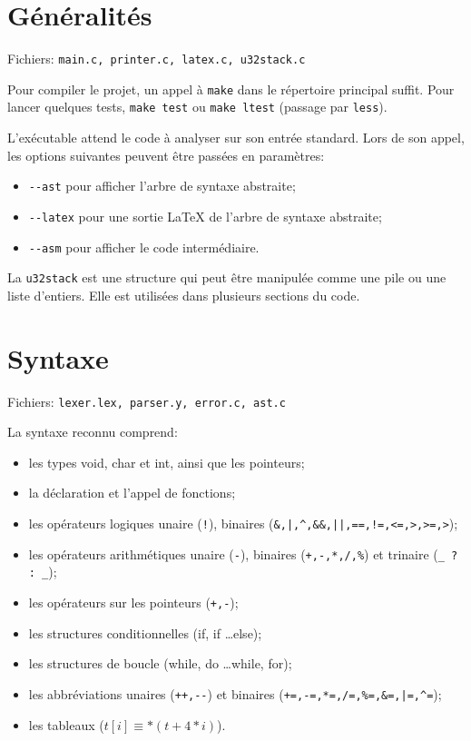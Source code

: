 \documentclass{article}
\begin{document}
	\section{Généralités}
		\par Fichiers: \verb#main.c, printer.c, latex.c, u32stack.c#
		\par Pour compiler le projet, un appel à \verb#make# dans le répertoire principal suffit. Pour lancer quelques tests, \verb#make test# ou \verb#make ltest# (passage par \verb#less#).
		\par L'exécutable attend le code à analyser sur son entrée standard. Lors de son appel, les options suivantes peuvent être passées en paramètres:
		\begin{itemize}
			\item \verb#--ast# pour afficher l'arbre de syntaxe abstraite;
			\item \verb#--latex# pour une sortie LaTeX de l'arbre de syntaxe abstraite;
			\item \verb#--asm# pour afficher le code intermédiaire.
		\end{itemize}
		\par La \verb#u32stack# est une structure qui peut être manipulée comme une pile ou une liste d'entiers. Elle est utilisées dans plusieurs sections du code.
	\section{Syntaxe}
		\par Fichiers: \verb#lexer.lex, parser.y, error.c, ast.c#
		\par La syntaxe reconnu comprend:
		\begin{itemize}
			\item les types void, char et int, ainsi que les pointeurs;
			\item la déclaration et l'appel de fonctions;
			\item les opérateurs logiques unaire (\verb#!#), binaires (\verb#&,|,^,&&,||,==,!=,<=,>,>=,>#);
			\item les opérateurs arithmétiques unaire (\verb#-#), binaires (\verb#+,-,*,/,%#) et trinaire (\verb#_ ? : _#);
			\item les opérateurs sur les pointeurs (\verb#+,-#);
			\item les structures conditionnelles (if, if \dots else);
			\item les structures de boucle (while, do \dots while, for);
			\item les abbréviations unaires (\verb#++,--#) et binaires (\verb#+=,-=,*=,/=,%=,&=,|=,^=#);
			\item les tableaux ($t[i] \equiv *(t + 4*i)$).
		\end{itemize}
\end{document}
